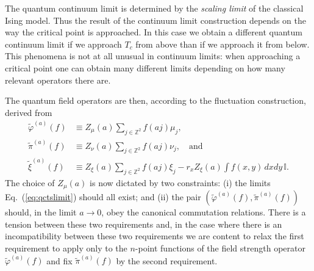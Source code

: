 \documentclass[prl,twocolumn,lengthcheck,superscriptaddress]{revtex4-1}
\theoremstyle{definition}
\theoremstyle{remark}
\begin{document}
The quantum continuum limit is determined by the \emph{scaling limit} of the classical Ising model. Thus the result of the continuum limit construction depends on the way the critical point is approached. In this case we obtain a different quantum continuum limit if we approach $T_c$ from above than if we approach it from below. This phenomena is not at all unusual in continuum limits: when approaching a critical point one can obtain many different limits depending on how many relevant operators there are.

The quantum field operators are then, according to the fluctuation construction, derived from
\begin{equation}
	\begin{split}
		\widetilde{\varphi}^{(a)}(f) &\equiv Z_{\mu}(a) \sum_{j\in \mathbb{Z}^2} f(aj) \mu_j,\\
		\widetilde{\pi}^{(a)}(f) &\equiv Z_{\nu}(a) \sum_{j\in \mathbb{Z}^2} f(aj) \nu_j, \quad \text{and}\\
		\widetilde{\xi}^{(a)}(f) &\equiv Z_{\xi}(a) \sum_{j\in \mathbb{Z}^2} f(aj) \xi_j - r_xZ_{\xi}(a) \int f(x,y) \,dxdy\, \mathbb{I}.
	\end{split}
\end{equation}
The choice of $Z_{\mu}(a)$ is now dictated by two constraints: (i) the limits Eq.~(\ref{eq:qctslimit}) should all exist; and (ii) the pair $(\widetilde{\varphi}^{(a)}(f),\widetilde{\pi}^{(a)}(f) )$ should, in the limit $a\rightarrow 0$, obey the canonical commutation relations. There is a tension between these two requirements and, in the case where there is an incompatibility between these two requirements we are content to relax the first requirement to apply only to the $n$-point functions of the field strength operator $\widetilde{\varphi}^{(a)}(f)$ and fix $\widetilde{\pi}^{(a)}(f)$ by the second requirement. 
\end{document}
